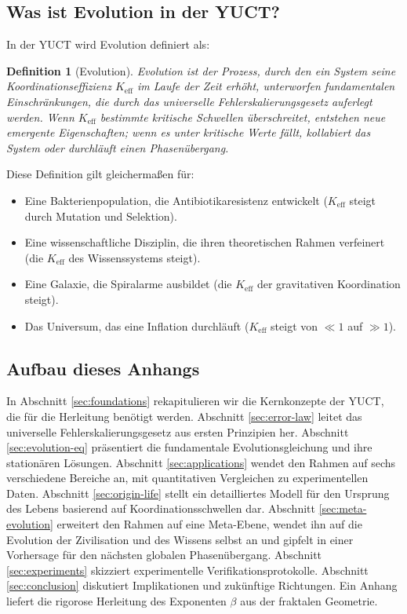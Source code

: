 \documentclass[12pt,a4paper]{article}
\newtheorem{definition}[theorem]{Definition}
\theoremstyle{remark}
\newcommand{\Keff}{K_{\mathrm{eff}}}
\begin{document}
	\subsection{Was ist Evolution in der YUCT?}
	
	In der YUCT wird Evolution definiert als:
	
	\begin{definition}[Evolution]
		Evolution ist der Prozess, durch den ein System seine Koordinationseffizienz $\Keff$ im Laufe der Zeit erhöht, unterworfen fundamentalen Einschränkungen, die durch das universelle Fehlerskalierungsgesetz auferlegt werden. Wenn $\Keff$ bestimmte kritische Schwellen überschreitet, entstehen neue emergente Eigenschaften; wenn es unter kritische Werte fällt, kollabiert das System oder durchläuft einen Phasenübergang.
	\end{definition}
	
	Diese Definition gilt gleichermaßen für:
	
	\begin{itemize}
		\item Eine Bakterienpopulation, die Antibiotikaresistenz entwickelt ($\Keff$ steigt durch Mutation und Selektion).
		\item Eine wissenschaftliche Disziplin, die ihren theoretischen Rahmen verfeinert (die $\Keff$ des Wissenssystems steigt).
		\item Eine Galaxie, die Spiralarme ausbildet (die $\Keff$ der gravitativen Koordination steigt).
		\item Das Universum, das eine Inflation durchläuft ($\Keff$ steigt von $\ll 1$ auf $\gg 1$).
	\end{itemize}
	
	\subsection{Aufbau dieses Anhangs}
	
	In Abschnitt \ref{sec:foundations} rekapitulieren wir die Kernkonzepte der YUCT, die für die Herleitung benötigt werden. Abschnitt \ref{sec:error-law} leitet das universelle Fehlerskalierungsgesetz aus ersten Prinzipien her. Abschnitt \ref{sec:evolution-eq} präsentiert die fundamentale Evolutionsgleichung und ihre stationären Lösungen. Abschnitt \ref{sec:applications} wendet den Rahmen auf sechs verschiedene Bereiche an, mit quantitativen Vergleichen zu experimentellen Daten. Abschnitt \ref{sec:origin-life} stellt ein detailliertes Modell für den Ursprung des Lebens basierend auf Koordinationsschwellen dar. Abschnitt \ref{sec:meta-evolution} erweitert den Rahmen auf eine Meta-Ebene, wendet ihn auf die Evolution der Zivilisation und des Wissens selbst an und gipfelt in einer Vorhersage für den nächsten globalen Phasenübergang. Abschnitt \ref{sec:experiments} skizziert experimentelle Verifikationsprotokolle. Abschnitt \ref{sec:conclusion} diskutiert Implikationen und zukünftige Richtungen. Ein Anhang liefert die rigorose Herleitung des Exponenten $\beta$ aus der fraktalen Geometrie.
	
\end{document}
